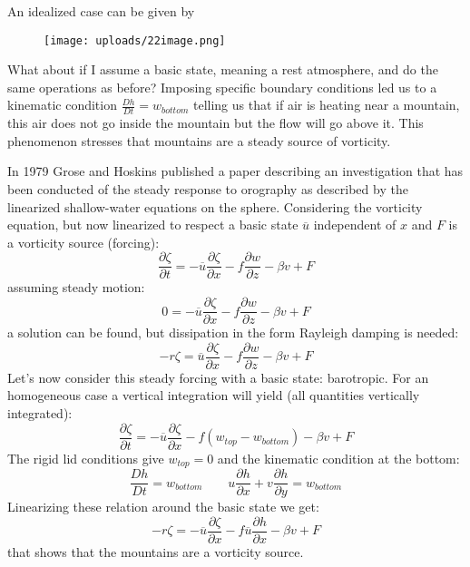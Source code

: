 An idealized case can be given by
\begin{figure}[htpb]
	\centering
	\texttt{[image: uploads/22image.png]}
\end{figure}

What about if I assume a basic state, meaning a rest atmosphere, and do the same operations as before? Imposing specific boundary conditions led us to a kinematic condition $\frac{Dh}{Dt}=w_{bottom}$ telling us that if air is heating near a mountain, this air does not go inside the mountain but the flow will go above it. This phenomenon stresses that mountains are a steady source of vorticity.


In 1979 Grose and Hoskins\cite{grose78} published a paper describing an investigation that has been conducted of the steady response to orography as described by the linearized shallow-water equations on the sphere. Considering the vorticity equation, but now linearized to respect a basic state $\overline{u}$ independent of $x$ and $F$ is a vorticity source (forcing):
\begin{equation}\label{eq.vortlinearized}
	\frac{\partial\zeta}{\partial t}=-\overline{u}\frac{\partial\zeta}{\partial x}-f\frac{\partial w}{\partial z}-\beta v+F
\end{equation}
assuming steady motion:
\begin{equation}
	0=-\overline{u}\frac{\partial\zeta}{\partial x}-f\frac{\partial w}{\partial z}-\beta v+F
\end{equation}
a solution can be found, but dissipation in the form Rayleigh damping is needed:
\begin{equation}
	-r\zeta=\overline{u}\frac{\partial\zeta}{\partial x}-f\frac{\partial w}{\partial z}-\beta v+F
\end{equation}
Let's now consider this steady forcing with a basic state: barotropic. For an homogeneous case a vertical integration will yield (all quantities vertically integrated):
\begin{equation}
	\frac{\partial\zeta}{\partial t}=-\overline{u}\frac{\partial\zeta}{\partial x}-f(w_{top}-w_{bottom})-\beta v+F
\end{equation}
The rigid lid conditions give $w_{top}=0$ and the kinematic condition at the bottom:
$$\frac{Dh}{Dt}=w_{bottom}\qquad u\frac{\partial h}{\partial x}+v\frac{\partial h}{\partial y}=w_{bottom}$$
Linearizing these relation around the basic state we get:
\begin{equation}
	- r\zeta=-\overline{u}\frac{\partial\zeta}{\partial x}-f\overline{u}\frac{\partial h}{\partial x}-\beta v+F
\end{equation}
that shows that the mountains are a vorticity source. \\

